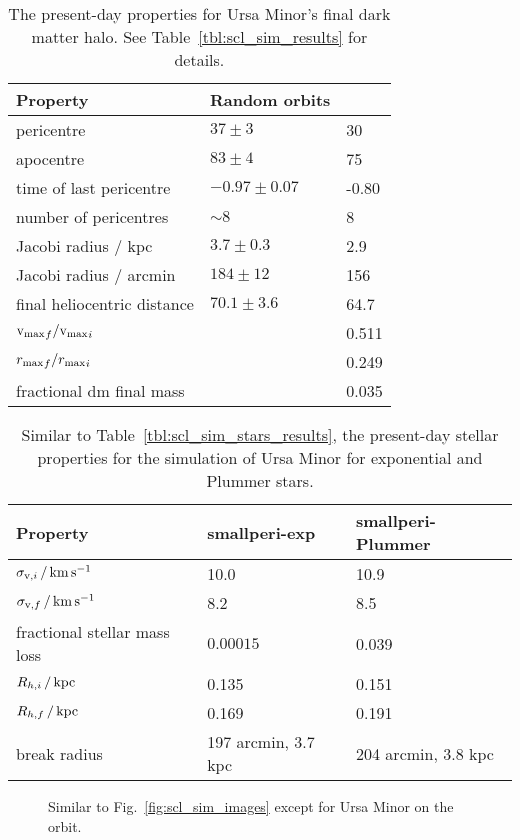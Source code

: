 \begin{table*}[t]
\centering
\caption[Simulation results for Ursa Minor’s dark matter]{The present-day properties for Ursa Minor’s final dark matter halo. See Table \ref{tbl:scl_sim_results} for details. }
\label{tbl:umi_sim_results}
\begin{tabular}{lll}
\toprule
Property & Random orbits & \smallperi{}\\
\midrule
pericentre & $37\pm3$ & 30\\
apocentre & $83 \pm 4$ & 75\\
time of last pericentre & $-0.97 \pm 0.07$ & -0.80\\
number of pericentres & $\sim 8$ & 8\\
Jacobi radius / kpc & $3.7 \pm 0.3$ & 2.9\\
Jacobi radius / arcmin & $184 \pm 12$ & 156\\
final heliocentric distance & $70.1 \pm 3.6$ & 64.7\\
${{\rm v}_{\rm max}}_f / {{\rm v}_{\rm max}}_i$ &  & 0.511\\
${r_{\rm max}}_f / {r_{\rm max}}_i$ &  & 0.249\\
fractional dm final mass &  & 0.035\\
\bottomrule
\end{tabular}
\end{table*}

\begin{table*}[t]
\centering
\caption[Simulation results for Ursa Minor’s stars]{Similar to Table \ref{tbl:scl_sim_stars_results}, the present-day stellar properties for the simulation of Ursa Minor for exponential and Plummer stars. }
\label{tbl:umi_sim_stars_results}
\begin{tabular}{lll}
\toprule
Property & smallperi-exp & smallperi-Plummer\\
\midrule
$\sigma_{{\rm v}, i}\,/\,{\rm km\,s^{-1}}$ & 10.0 & 10.9\\
$\sigma_{{\rm v}, f}\,/\,{\rm km\,s^{-1}}$ & 8.2 & 8.5\\
fractional stellar mass loss & $0.00015$ & 0.039\\
$R_{h, i}\,/\,{\rm kpc}$ & 0.135 & 0.151\\
$R_{h, f}\,/\,{\rm kpc}$ & 0.169 & 0.191\\
break radius & 197 arcmin, 3.7 kpc & 204 arcmin, 3.8 kpc\\
\bottomrule
\end{tabular}
\end{table*}

\begin{figure}
\centering
{}
\caption[Ursa Minor simulation snapshots]{Similar to
Fig.~\ref{fig:scl_sim_images} except for Ursa Minor on the \smallperi{}
orbit.}\label{fig:umi_sim_images}
\end{figure}

